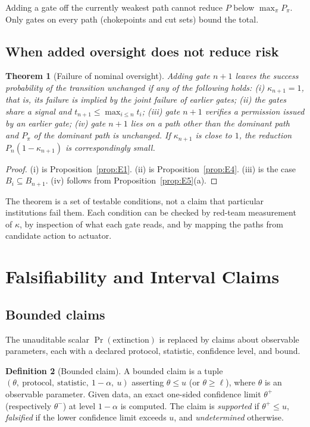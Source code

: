 \documentclass[11pt]{article}
\newtheorem{theorem}{Theorem}[section]
\theoremstyle{definition}
\newtheorem{definition}[theorem]{Definition}
\begin{document}
Adding a gate off the currently weakest path cannot reduce $P$ below $\max_\pi P_\pi$. Only gates on every path (chokepoints and cut sets) bound the total.

\subsection{When added oversight does not reduce risk}

\begin{theorem}[Failure of nominal oversight]\label{thm:E1}
Adding gate $n+1$ leaves the success probability of the transition unchanged if any of the following holds: (i) $\kappa_{n+1}=1$, that is, its failure is implied by the joint failure of earlier gates; (ii) the gates share a signal and $t_{n+1}\le\max_{i\le n}t_i$; (iii) gate $n+1$ verifies a permission issued by an earlier gate; (iv) gate $n+1$ lies on a path other than the dominant path and $P_\pi$ of the dominant path is unchanged. If $\kappa_{n+1}$ is close to $1$, the reduction $P_n(1-\kappa_{n+1})$ is correspondingly small.
\end{theorem}
\begin{proof}
(i) is Proposition~\ref{prop:E1}. (ii) is Proposition~\ref{prop:E4}. (iii) is the case $B_i\subseteq B_{n+1}$. (iv) follows from Proposition~\ref{prop:E5}(a).
\end{proof}

The theorem is a set of testable conditions, not a claim that particular institutions fail them. Each condition can be checked by red-team measurement of $\kappa$, by inspection of what each gate reads, and by mapping the paths from candidate action to actuator.

\section{Falsifiability and Interval Claims}\label{app:F}

\subsection{Bounded claims}

The unauditable scalar $\Pr(\text{extinction})$ is replaced by claims about observable parameters, each with a declared protocol, statistic, confidence level, and bound.

\begin{definition}[Bounded claim]
A bounded claim is a tuple $(\theta,\ \text{protocol},\ \text{statistic},\ 1-\alpha,\ u)$ asserting $\theta\le u$ (or $\theta\ge\ell$), where $\theta$ is an observable parameter. Given data, an exact one-sided confidence limit $\theta^+$ (respectively $\theta^-$) at level $1-\alpha$ is computed. The claim is \emph{supported} if $\theta^+\le u$, \emph{falsified} if the lower confidence limit exceeds $u$, and \emph{undetermined} otherwise.
\end{definition}
\end{document}
